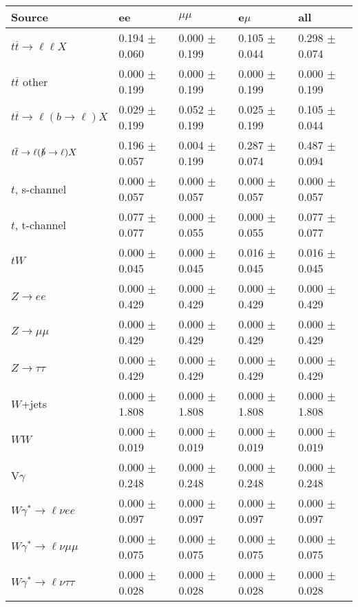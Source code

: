 \begin{tabular}{l | l l l l}
\hline\hline
 Source  &  ee  &  $\mu\mu$  &  e$\mu$  &  all \\
\hline
$t\overline{t}\rightarrow \ell\ell X$ &  0.194 $\pm$  0.060 &  0.000 $\pm$  0.199 &  0.105 $\pm$  0.044 &  0.298 $\pm$  0.074\\
$t\overline{t}$ other &  0.000 $\pm$  0.199 &  0.000 $\pm$  0.199 &  0.000 $\pm$  0.199 &  0.000 $\pm$  0.199\\
$t\overline{t}\rightarrow \ell(b\rightarrow \ell)X$ &  0.029 $\pm$  0.199 &  0.052 $\pm$  0.199 &  0.025 $\pm$  0.199 &  0.105 $\pm$  0.044\\
$t\overline{t}\rightarrow \ell(\slashed{b}\rightarrow \ell)X$ &  0.196 $\pm$  0.057 &  0.004 $\pm$  0.199 &  0.287 $\pm$  0.074 &  0.487 $\pm$  0.094\\
\hline
$t$, s-channel &  0.000 $\pm$  0.057 &  0.000 $\pm$  0.057 &  0.000 $\pm$  0.057 &  0.000 $\pm$  0.057\\
$t$, t-channel &  0.077 $\pm$  0.077 &  0.000 $\pm$  0.055 &  0.000 $\pm$  0.055 &  0.077 $\pm$  0.077\\
$tW$ &  0.000 $\pm$  0.045 &  0.000 $\pm$  0.045 &  0.016 $\pm$  0.045 &  0.016 $\pm$  0.045\\
\hline
$Z\rightarrow ee$ &  0.000 $\pm$  0.429 &  0.000 $\pm$  0.429 &  0.000 $\pm$  0.429 &  0.000 $\pm$  0.429\\
$Z\rightarrow\mu\mu$ &  0.000 $\pm$  0.429 &  0.000 $\pm$  0.429 &  0.000 $\pm$  0.429 &  0.000 $\pm$  0.429\\
$Z\rightarrow\tau\tau$ &  0.000 $\pm$  0.429 &  0.000 $\pm$  0.429 &  0.000 $\pm$  0.429 &  0.000 $\pm$  0.429\\
$W$+jets &  0.000 $\pm$  1.808 &  0.000 $\pm$  1.808 &  0.000 $\pm$  1.808 &  0.000 $\pm$  1.808\\
$WW$ &  0.000 $\pm$  0.019 &  0.000 $\pm$  0.019 &  0.000 $\pm$  0.019 &  0.000 $\pm$  0.019\\
\hline
V$\gamma$ &  0.000 $\pm$  0.248 &  0.000 $\pm$  0.248 &  0.000 $\pm$  0.248 &  0.000 $\pm$  0.248\\
$W\gamma^{*}\rightarrow\ell\nu e e$ &  0.000 $\pm$  0.097 &  0.000 $\pm$  0.097 &  0.000 $\pm$  0.097 &  0.000 $\pm$  0.097\\
$W\gamma^{*}\rightarrow\ell\nu\mu\mu$ &  0.000 $\pm$  0.075 &  0.000 $\pm$  0.075 &  0.000 $\pm$  0.075 &  0.000 $\pm$  0.075\\
$W\gamma^{*}\rightarrow\ell\nu\tau\tau$ &  0.000 $\pm$  0.028 &  0.000 $\pm$  0.028 &  0.000 $\pm$  0.028 &  0.000 $\pm$  0.028\\

\end{tabular}
